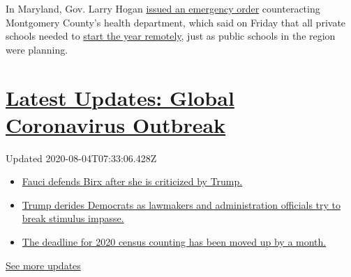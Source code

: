 In Maryland, Gov. Larry Hogan
\href{https://twitter.com/GovLarryHogan/status/1290330304830246912}{issued
an emergency order} counteracting Montgomery County's health department,
which said on Friday that all private schools needed to
\href{https://www.washingtonpost.com/local/education/montgomery-county-health-officials-tell-private-schools-to-start-school-online/2020/08/01/64552b9e-d3fd-11ea-9038-af089b63ac21_story.html}{start
the year remotely}, just as public schools in the region were planning.

\hypertarget{latest-updates-global-coronavirus-outbreak}{%
\section{\texorpdfstring{\href{https://www.nytimes3xbfgragh.onion/2020/08/03/world/coronavirus-covid-19.html?action=click\&pgtype=Article\&state=default\&region=MAIN_CONTENT_1\&context=storylines_live_updates}{Latest
Updates: Global Coronavirus
Outbreak}}{Latest Updates: Global Coronavirus Outbreak}}\label{latest-updates-global-coronavirus-outbreak}}

Updated 2020-08-04T07:33:06.428Z

\begin{itemize}
\tightlist
\item
  \href{https://www.nytimes3xbfgragh.onion/2020/08/03/world/coronavirus-covid-19.html?action=click\&pgtype=Article\&state=default\&region=MAIN_CONTENT_1\&context=storylines_live_updates\#link-4547638f}{Fauci
  defends Birx after she is criticized by Trump.}
\item
  \href{https://www.nytimes3xbfgragh.onion/2020/08/03/world/coronavirus-covid-19.html?action=click\&pgtype=Article\&state=default\&region=MAIN_CONTENT_1\&context=storylines_live_updates\#link-15e7f995}{Trump
  derides Democrats as lawmakers and administration officials try to
  break stimulus impasse.}
\item
  \href{https://www.nytimes3xbfgragh.onion/2020/08/03/world/coronavirus-covid-19.html?action=click\&pgtype=Article\&state=default\&region=MAIN_CONTENT_1\&context=storylines_live_updates\#link-e5a2cda}{The
  deadline for 2020 census counting has been moved up by a month.}
\end{itemize}

\href{https://www.nytimes3xbfgragh.onion/2020/08/03/world/coronavirus-covid-19.html?action=click\&pgtype=Article\&state=default\&region=MAIN_CONTENT_1\&context=storylines_live_updates}{See
more updates}

